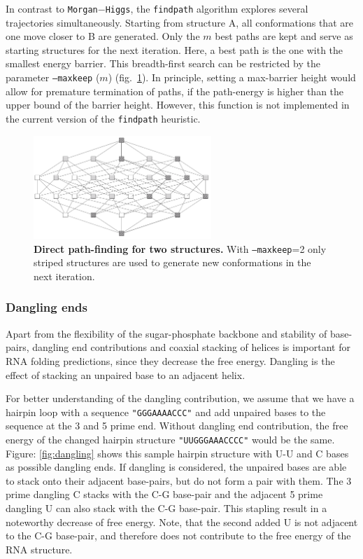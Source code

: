 \documentclass[ twoside,openright,titlepage,numbers=noenddot,headinclude,%
                footinclude=false, cleardoublepage=empty,abstractoff, %
                BCOR=5mm,paper=a4,fontsize=11pt,%
                ngerman,american,%
                ]{scrreprt}
\begin{document}
In contrast to \texttt{Morgan$-$Higgs}, the \texttt{findpath} algorithm explores
several trajectories simultaneously. Starting from structure A, all
conformations that are one move closer to B are generated. Only the $m$
best paths are kept and serve as starting structures for the next
iteration. Here, a best path is the one with the smallest energy
barrier. This breadth-first search can be restricted by the parameter
\texttt{--maxkeep} ($m$) (fig.~\ref{fig:find-pathSearch}). In principle, setting a max-barrier height would allow for premature
termination of paths, if the path-energy is higher than the upper bound of
the barrier height. However, this function is not implemented in the
current version of the \texttt{findpath} heuristic.

\begin{figure}
\includegraphics[width=0.6\textwidth]{./pictures/find-path.png}
\caption{{\bf Direct path-finding for two structures.} With \texttt{--maxkeep}=2 only striped structures are used to generate new conformations in the next iteration.}
\label{fig:find-pathSearch}
\end{figure}

\FloatBarrier
\subsubsection{Dangling ends}


Apart from the flexibility of the sugar-phosphate backbone and stability of
base-pairs, dangling end contributions and coaxial stacking of helices is important for RNA folding predictions\cite{walter:94}\cite{neilson:80}, since they decrease the free energy. Dangling is the effect of stacking an unpaired base to an adjacent helix. 


For better understanding of the dangling contribution, we assume that we
have a hairpin loop with a sequence \texttt{"GGGAAAACCC"} and add unpaired
bases to the sequence at the 3 and 5 prime end. Without dangling end
contribution, the free energy of the changed hairpin structure
\texttt{"UUGGGAAACCCC"} would be the same. Figure: \ref{fig:dangling} shows
this sample hairpin structure with U-U and C bases as possible dangling
ends. If dangling is considered, the unpaired bases are able to stack onto
their adjacent base-pairs, but do not form a pair with them. The 3 prime
dangling C stacks with the C-G base-pair and the adjacent 5 prime
dangling U can also stack with the C-G base-pair. This stapling result in a
noteworthy decrease of free energy\cite{walter:94}. Note, that the second
added U is not adjacent to the C-G base-pair, and therefore does not
contribute to the free energy of the RNA structure.
\end{document}
